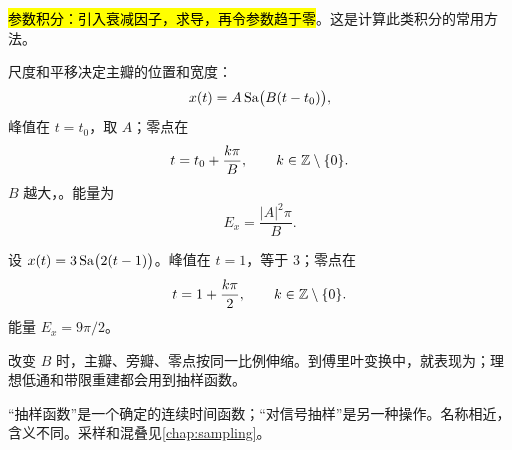 \hl{参数积分：引入衰减因子，求导，再令参数趋于零}。这是计算此类积分的常用方法。

尺度和平移决定主瓣的位置和宽度：
\begin{equation}
  x(t)=A\operatorname{Sa}\bigl(B(t-t_0)\bigr),
  \label{eq:scaled-shifted-sampling-function}
\end{equation}
峰值在 $t=t_0$，取 $A$；零点在
\[
  t=t_0+\frac{k\pi}{B},
  \qquad k\in\mathbb{Z}\setminus\{0\}.
\]
$B$ 越大，。能量为
\begin{equation}
  E_x=\frac{|A|^2\pi}{B}.
  \label{eq:scaled-sampling-function-energy}
\end{equation}

\begin{example}
  设 $x(t)=3\operatorname{Sa}\bigl(2(t-1)\bigr)$。峰值在 $t=1$，等于 $3$；零点在
  \[
    t=1+\frac{k\pi}{2},
    \qquad k\in\mathbb{Z}\setminus\{0\}.
  \]
  能量 $E_x=9\pi/2$。
\end{example}

改变 $B$ 时，主瓣、旁瓣、零点按同一比例伸缩。到傅里叶变换中，就表现为；理想低通和带限重建都会用到抽样函数。

“抽样函数”是一个确定的连续时间函数；“对信号抽样”是另一种操作。名称相近，含义不同。采样和混叠见\cref{chap:sampling}。
